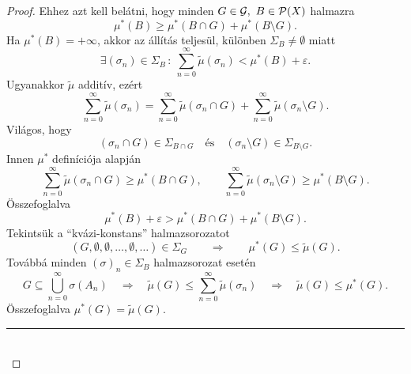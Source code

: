 \documentclass[
]{elteikthesis}[2024/04/26]
\begin{document}
\begin{proof}
		Ehhez azt kell belátni, hogy minden \( G \in \mathcal{G}, \ B \in \mathcal{P}( X ) \) halmazra
		\[
			\mu^*(B) \geq
			\mu^*(B \cap G) + \mu^*(B \setminus G).
		\]
		Ha \( \mu^*(B) = +\infty \), akkor az állítás teljesül, 
		különben \( \Sigma_B \neq \emptyset \) miatt
		\[
			\exists (\sigma_n) \in \Sigma_B \, \colon \
			\sum_{n=0}^{\infty} \widetilde{\mu}( \sigma_n ) < \mu^*(B) + \varepsilon.
		\]
		Ugyanakkor \( \widetilde{\mu} \) additív, ezért
		\[
			\sum_{n=0}^{\infty} \widetilde{\mu}( \sigma_n ) =
			\sum_{n=0}^{\infty} \widetilde{\mu}( \sigma_n \cap G ) +
			\sum_{n=0}^{\infty} \widetilde{\mu}( \sigma_n \setminus G ).
		\]
		Világos, hogy
		\[
			(\sigma_n \cap G) \in \Sigma_{B \cap G}
			\quad \text{és} \quad
			(\sigma_n \setminus G) \in \Sigma_{B \setminus G}.
		\]
		Innen \( \mu^* \) definíciója alapján
		\[
			\sum_{n=0}^{\infty} \widetilde{\mu}( \sigma_n \cap G ) \geq \mu^*( B \cap G ), \qquad
			\sum_{n=0}^{\infty} \widetilde{\mu}( \sigma_n \setminus G ) \geq \mu^*( B \setminus G ).
		\]
		Összefoglalva
		\[
			\mu^*(B) + \varepsilon >
			\mu^*( B \cap G ) + \mu^*( B \setminus G ).
		\]
		Tekintsük a ``kvázi-konstans'' halmazsorozatot
		\[
			(G, \emptyset, \emptyset, \dots, \emptyset, \dots) \in \Sigma_G
			\qquad \Longrightarrow \qquad
			\mu^*( G ) \leq \widetilde{\mu}( G ).
		\]
		Továbbá minden \( (\sigma)_n \in \Sigma_B \) halmazsorozat esetén
		\[
			G \subseteq \bigcup_{n=0}^{\infty} \sigma( A_n )
			\quad \Longrightarrow \quad
			\widetilde{\mu}( G ) \leq \sum_{n=0}^{\infty} \widetilde{\mu}( \sigma_n )
			\quad \Longrightarrow \quad
			\widetilde{\mu}( G ) \leq \mu^*( G ).
		\]
		Összefoglalva \( \mu^*( G ) = \widetilde{\mu}( G ) \).
		
		\noindent\rule{\linewidth}{0.4pt}\\
		

\end{proof}
\end{document}
